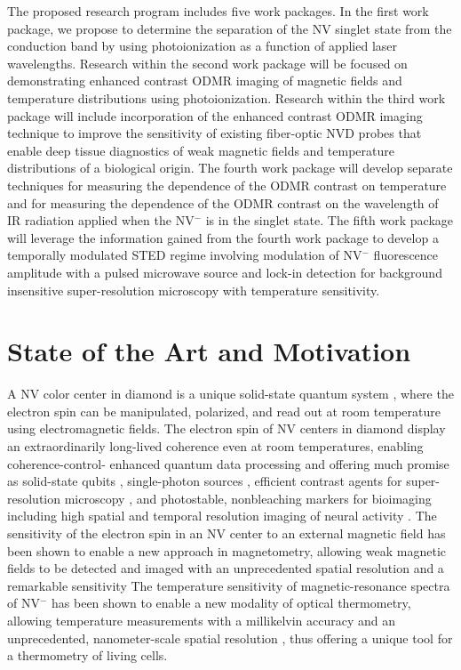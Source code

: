 \documentclass[11pt]{article}
\begin{document}
The proposed research program includes five work packages.  In the first work package, we propose to determine 
the separation of the NV singlet state from the conduction band by using photoionization as a function of applied 
laser wavelengths.  Research within the second work package will be focused on demonstrating enhanced contrast 
ODMR imaging of magnetic fields and temperature distributions using photoionization.  Research within the third 
work package will include incorporation of the enhanced contrast ODMR imaging technique to improve the 
sensitivity of existing fiber-optic NVD probes that enable deep tissue diagnostics of weak magnetic fields and 
temperature distributions of a biological origin.  The fourth work package will develop separate techniques for 
measuring the dependence of the ODMR contrast on temperature and for measuring the dependence of the ODMR 
contrast on the wavelength of IR radiation applied when the NV$^-$ is in the singlet state.  The fifth work package 
will leverage the information gained from the fourth work package to develop a temporally modulated STED regime 
involving modulation of NV$^-$ fluorescence amplitude with a pulsed microwave source and lock-in detection for 
background insensitive super-resolution microscopy with temperature sensitivity.

\section{State of the Art and Motivation}
A NV color center in diamond is a unique solid-state quantum system \cite{Gaebel2006,Dutt2007,Aharonovich2011}, where the electron
spin can be manipulated, polarized, and read out at room temperature using electromagnetic
fields. The electron spin of NV centers in diamond display an extraordinarily long-lived
coherence even at room temperatures, \cite{Gaebel2006,Dutt2007,Aharonovich2011,Childress2006} enabling coherence-control- enhanced quantum data
processing \cite{Dutt2007,Aharonovich2011} and offering much promise as solid-state qubits \cite{Dutt2007,Aharonovich2011,Childress2006,Nizovtsev2005}, single-photon sources \cite{Beveratos2002}
, efficient contrast agents for super-resolution microscopy \cite{Gruber1997}, and photostable, nonbleaching
markers for bioimaging \cite{Gruber1997,McGuinness2011} including high spatial and temporal resolution imaging of neural
activity \cite{Hall2012}. The sensitivity of the electron spin in an NV center to an external magnetic field has
been shown to enable a new approach in magnetometry, allowing weak magnetic fields to be
detected and imaged with an unprecedented spatial resolution and a remarkable sensitivity \cite{LeSage2013,Taylor2008,Maze2008,Balasubramanian2008}
The temperature sensitivity of magnetic-resonance spectra of NV$^-$ \cite{Acosta2010}
has been shown to enable a new modality of optical thermometry, allowing temperature
measurements with a millikelvin accuracy and an unprecedented, nanometer-scale spatial
resolution \cite{Kucsko2013}, thus offering a unique tool for a thermometry of living cells.
\end{document}

